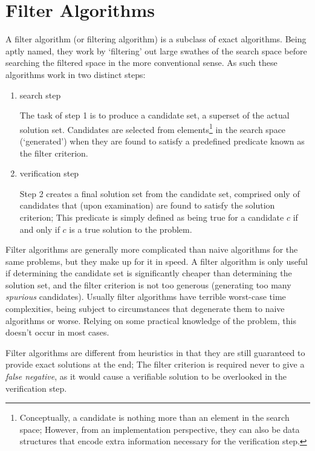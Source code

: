 \section{Filter Algorithms}

A \gls{filter algorithm} (or filtering algorithm) is a subclass of exact algorithms. Being aptly named, they work by `filtering' out large swathes of the search space before searching the filtered space in the more conventional sense. As such these algorithms work in two distinct steps:
\begin{enumerate}
\item \Gls{search step}

The task of step 1 is to produce a \gls{candidate} set, a superset of the actual \gls{solution} set. Candidates are selected from elements\footnote{Conceptually, a candidate is nothing more than an element in the search space; However, from an implementation perspective, they can also be data structures that encode extra information necessary for the verification step.} in the search space (`generated') when they are found to satisfy a predefined predicate known as the \gls{filter criterion}.

\item \Gls{verification step}

Step 2 creates a final solution set from the candidate set, comprised only of candidates that (upon examination) are found to satisfy the \gls{solution criterion}; This predicate is simply defined as being true for a candidate $c$ if and only if $c$ is a true solution to the problem.

\end{enumerate}
 
\noindent
Filter algorithms are generally more complicated than naive algorithms for the same problems, but they make up for it in speed. A filter algorithm is only useful if determining the candidate set is significantly cheaper than determining the solution set, and the filter criterion is not too generous (generating too many \textit{spurious} candidates). Usually filter algorithms have terrible worst-case time complexities, being subject to circumstances that degenerate them to naive algorithms or worse. Relying on some practical knowledge of the problem, this doesn't occur in most cases.
 
Filter algorithms are different from heuristics in that they are still guaranteed to provide exact solutions at the end; The filter criterion is required never to give a \textit{false negative}, as it would cause a verifiable solution to be overlooked in the verification step.
